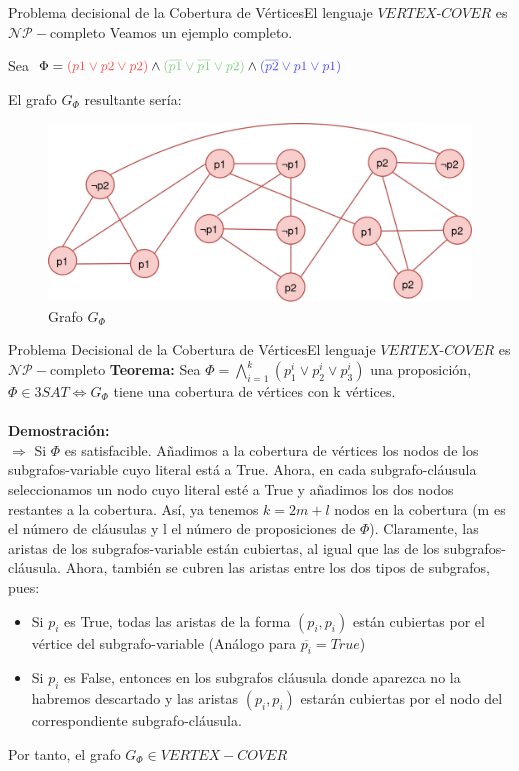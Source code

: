 \documentclass[10pt, envcountsect, presentation, aspectratio=169]{beamer}
\begin{document}

\begin{frame}{Problema decisional de la Cobertura de Vértices}{El lenguaje $VERTEX\text{-}COVER$ es $\mathcal{NP}-$completo}
    \centering
    Veamos un ejemplo completo.

    Sea $\Phi = \textcolor{palered}{(p1 \vee p2 \vee p2)} \wedge \textcolor{palegreen}{(\overline{p1} \vee \overline{p1} \vee p2)} \wedge \textcolor{paleblue}{(\overline{p2} \vee p1 \vee p1)}$

    El grafo $G_\Phi$ resultante sería:
    \begin{figure}
        \centering
        \includegraphics[width=0.65\linewidth]{images/T2_3_ejemploGrafo.png}
        \caption{Grafo $G_\Phi$}
        \label{fig:enter-label}
    \end{figure}
\end{frame}


\begin{frame}{Problema Decisional de la Cobertura de Vértices}{El lenguaje $VERTEX\text{-}COVER$ es $\mathcal{NP}-$completo}
    \textbf{Teorema:} Sea $\Phi=\bigwedge_{i=1}^k(p_1^i \vee p_2^i \vee p_3^i)$ una proposición, $\Phi \in 3SAT \Leftrightarrow G_\Phi$  tiene una cobertura de vértices con k vértices. \\~\\

    \textbf{Demostración:} \\
    $\boxed{\Rightarrow}$ Si $\Phi$ es satisfacible. Añadimos a la cobertura de vértices los nodos de los subgrafos-variable cuyo literal está a True. 
    Ahora, en cada subgrafo-cláusula seleccionamos un nodo cuyo literal esté a True y añadimos los dos nodos restantes a la cobertura. Así, ya tenemos $k = 2m + l$ nodos en la cobertura (m es el número de cláusulas y l el número de proposiciones de $\Phi$).
    Claramente, las aristas de los subgrafos-variable están cubiertas, al igual que las de los subgrafos-cláusula. Ahora, también se cubren las aristas entre los dos tipos de subgrafos, pues:
    \begin{itemize}
        \item Si $p_i$ es True, todas las aristas de la forma $(p_i,p_i)$ están cubiertas por el vértice del subgrafo-variable (Análogo para $\overline{p_i} = True$)
        \item Si $p_i$ es False, entonces en los subgrafos cláusula donde aparezca no la habremos descartado y las aristas $(p_i,p_i)$ estarán cubiertas por el nodo del correspondiente subgrafo-cláusula.
    \end{itemize}
    Por tanto, el grafo $G_\Phi \in VERTEX-COVER$
    
\end{frame}
\end{document}
